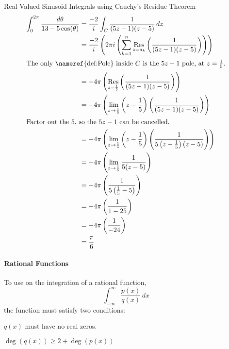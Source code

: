 \begin{example}{Real-Valued Sinusoid Integrals using Cauchy's Residue Theorem}
  \begin{align*}
    \int_{0}^{2\pi} \frac{d\theta}{13 - 5\cos(\theta)} &= \frac{-2}{i} \int_{C} \frac{1}{(5z-1) (z-5)} \, dz \\
                                                       &= \frac{-2}{i} \left( 2 \pi i \left( \sum_{k=1}^{n} \Residue{\frac{1}{(5z-1) (z-5)}}{z=a_{k}} \right) \right) \\
    \intertext{The only \nameref{def:Pole} inside $C$ is the $5z-1$ pole, at $z = \frac{1}{5}$.}
                                                       &= -4 \pi \left( \Residue{\frac{1}{(5z-1) (z-5)}}{z=\frac{1}{5}} \right) \\
                                                       &= -4 \pi \left( \lim\limits_{z \to \frac{1}{5}} \left( z-\frac{1}{5} \right) \left( \frac{1}{(5z-1) (z-5)} \right) \right) \\
    \shortintertext{Factor out the $5$, so the $5z-1$ can be cancelled.}
                                                       &= -4 \pi \left( \lim\limits_{z \to \frac{1}{5}} \left( z-\frac{1}{5} \right) \left( \frac{1}{5 \left( z-\frac{1}{5} \right) (z-5)} \right) \right) \\
                                                       &= -4 \pi \left( \lim\limits_{z \to \frac{1}{5}} \frac{1}{5(z-5)} \right) \\
                                                       &= -4 \pi \left( \frac{1}{5 \left( \frac{1}{5} - 5 \right)} \right) \\
                                                       &= -4 \pi \left( \frac{1}{1-25} \right) \\
                                                       &= -4 \pi \left(\frac{1}{-24} \right) \\
                                                       &= \frac{\pi}{6}
  \end{align*}
\end{example}

\paragraph{Rational Functions}\label{par:Rational_Functions_Cauchys_Residue_Theorem}
To use  on the integration of a rational function,
\begin{equation*}
  \int_{-\infty}^{\infty} \frac{p(x)}{q(x)} \, dx
\end{equation*}
the function must satisfy two conditions:
\begin{propertylist}
\item $q(x)$ must have no real zeros.
\item $\deg(q(x)) \geq 2 + \deg(p(x))$
\end{propertylist}

